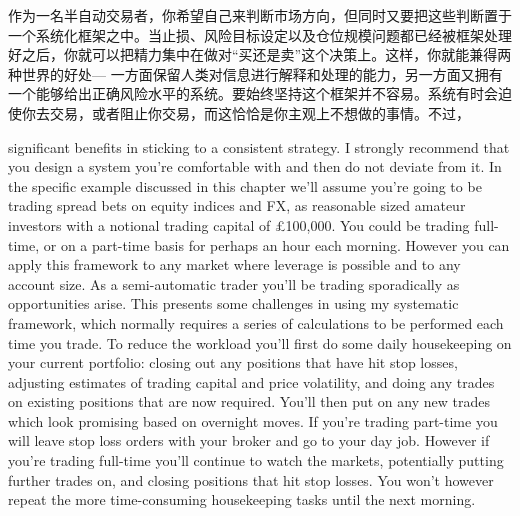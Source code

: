 \begin{chineseblock}作为一名半自动交易者，你希望自己来判断市场方向，但同时又要把这些判断置于一个系统化框架之中。当止损、风险目标设定以及仓位规模问题都已经被框架处理好之后，你就可以把精力集中在做对“买还是卖”这个决策上。这样，你就能兼得两种世界的好处--- 一方面保留人类对信息进行解释和处理的能力，另一方面又拥有一个能够给出正确风险水平的系统。要始终坚持这个框架并不容易。系统有时会迫使你去交易，或者阻止你交易，而这恰恰是你主观上不想做的事情。不过，\end{chineseblock}

\bipairgap

\begin{englishblock} significant benefits in sticking to a consistent strategy. I strongly recommend that you design a system you're comfortable with and then do not deviate from it. In the specific example discussed in this chapter we'll assume you're going to be trading spread bets on equity indices and FX, as reasonable sized amateur investors with a notional trading capital of £100,000. You could be trading full-time, or on a part-time basis for perhaps an hour each morning. However you can apply this framework to any market where leverage is possible and to any account size. As a semi-automatic trader you'll be trading sporadically as opportunities arise. This presents some challenges in using my systematic framework, which normally requires a series of calculations to be performed each time you trade. To reduce the workload you'll first do some daily housekeeping on your current portfolio: closing out any positions that have hit stop losses, adjusting estimates of trading capital and price volatility, and doing any trades on existing positions that are now required. You'll then put on any new trades which look promising based on overnight moves. If you're trading part-time you will leave stop loss orders with your broker and go to your day job. However if you're trading full-time you'll continue to watch the markets, potentially putting further trades on, and closing positions that hit stop losses. You won't however repeat the more time-consuming housekeeping tasks until the next morning. \end{englishblock}

